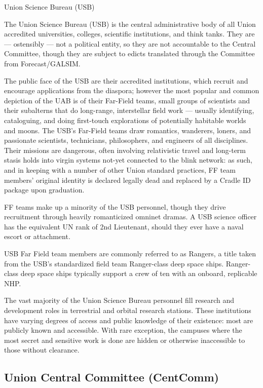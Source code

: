 Union Science Bureau (USB)  

The Union Science Bureau (USB) is the central administrative body of all Union accredited  
universities, colleges, scientific institutions, and think tanks. They are — ostensibly — not a  
political entity, so they are not accountable to the Central Committee, though they are subject to  
edicts translated through the Committee from Forecast/GALSIM. 
 

The public face of the USB are their accredited institutions, which recruit and encourage  
applications from the diaspora; however the most popular and common depiction of the UAB is  
of their Far-Field teams, small groups of scientists and their subalterns that do long-range,  
interstellar field work — usually identifying, cataloguing, and doing first-touch explorations of  
potentially habitable worlds and moons. The USB’s Far-Field teams draw romantics, wanderers,  
loners, and passionate scientists, technicians, philosophers, and engineers of all disciplines.  
Their missions are dangerous, often involving relativistic travel and long-term stasis holds into  
virgin systems not-yet connected to the blink network: as such, and in keeping with a number of  
other Union standard practices, FF team members’ original identity is declared legally dead and  
replaced by a Cradle ID package upon graduation. 
 

FF teams make up a minority of the USB personnel, though they drive recruitment through  
heavily romanticized omninet dramas. A USB science officer has the equivalent UN rank of 2nd  
Lieutenant, should they ever have a naval escort or attachment. 
 

USB Far Field team members are commonly referred to as Rangers, a title taken from the USB’s  
standardized field team Ranger-class deep space ships. Ranger-class deep space ships typically  
support a crew of ten with an onboard, replicable NHP.  
 

The vast majority of the Union Science Bureau personnel fill research and development roles in  
terrestrial and orbital research stations. These institutions have varying degrees of access and  
public knowledge of their existence: most are publicly known and accessible. With rare  
exception, the campuses where the most secret and sensitive work is done are hidden or  
otherwise inaccessible to those without clearance. 
 
 
\subsection{Union Central Committee (CentComm)}

